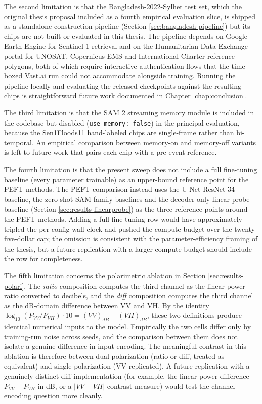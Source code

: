 \documentclass[11pt,a4paper,oneside]{report}
\begin{document}
The second limitation is that the Bangladesh-2022-Sylhet test set, which the original thesis proposal included as a fourth empirical evaluation slice, is shipped as a standalone construction pipeline (Section \ref{sec:bangladesh-pipeline}) but its chips are not built or evaluated in this thesis. The pipeline depends on Google Earth Engine for Sentinel-1 retrieval and on the Humanitarian Data Exchange portal for UNOSAT, Copernicus EMS and International Charter reference polygons, both of which require interactive authentication flows that the time-boxed Vast.ai run could not accommodate alongside training. Running the pipeline locally and evaluating the released checkpoints against the resulting chips is straightforward future work documented in Chapter \ref{chap:conclusion}.

The third limitation is that the SAM 2 streaming memory module is included in the codebase but disabled (\texttt{use\_memory: false}) in the principal evaluation, because the Sen1Floods11 hand-labeled chips are single-frame rather than bi-temporal. An empirical comparison between memory-on and memory-off variants is left to future work that pairs each chip with a pre-event reference.

The fourth limitation is that the present sweep does not include a full fine-tuning baseline (every parameter trainable) as an upper-bound reference point for the PEFT methods. The PEFT comparison instead uses the U-Net ResNet-34 baseline, the zero-shot SAM-family baselines and the decoder-only linear-probe baseline (Section \ref{sec:results-linearprobe}) as the three reference points around the PEFT methods. Adding a full-fine-tuning row would have approximately tripled the per-config wall-clock and pushed the compute budget over the twenty-five-dollar cap; the omission is consistent with the parameter-efficiency framing of the thesis, but a future replication with a larger compute budget should include the row for completeness.

The fifth limitation concerns the polarimetric ablation in Section \ref{sec:results-polari}. The \emph{ratio} composition computes the third channel as the linear-power ratio converted to decibels, and the \emph{diff} composition computes the third channel as the dB-domain difference between VV and VH. By the identity $\log_{10}(P_{VV}/P_{VH}) \cdot 10 = (VV)_{dB} - (VH)_{dB}$, these two definitions produce identical numerical inputs to the model. Empirically the two cells differ only by training-run noise across seeds, and the comparison between them does not isolate a genuine difference in input encoding. The meaningful contrast in this ablation is therefore between dual-polarization (ratio or diff, treated as equivalent) and single-polarization (VV replicated). A future replication with a genuinely distinct diff implementation (for example, the linear-power difference $P_{VV} - P_{VH}$ in dB, or a $|VV-VH|$ contrast measure) would test the channel-encoding question more cleanly.
\end{document}
